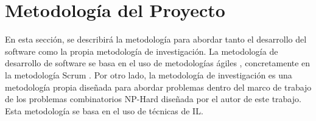 \section{Metodología del Proyecto}
En esta sección, se describirá la metodología para abordar tanto el
desarrollo del software como la propia metodología de investigación. La metodología
de desarrollo de software se basa en el uso de metodologías ágiles \cite{Agile_Microsoft}, concretamente
en la metodología Scrum \cite{Atlassian_Scrum}. Por otro lado, la metodología de investigación es una
metodología propia diseñada para abordar problemas dentro del marco de trabajo de
los problemas combinatorios NP-Hard diseñada por el autor de este trabajo. Esta
metodología se basa en el uso de técnicas de IL.

\pagebreak